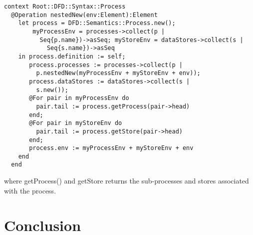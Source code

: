 \begin{lstlisting}
context Root::DFD::Syntax::Process
  @Operation nestedNew(env:Element):Element
    let process = DFD::Semantics::Process.new();
        myProcessEnv = processes->collect(p |
          Seq{p.name})->asSeq; myStoreEnv = dataStores->collect(s |
            Seq{s.name})->asSeq
    in process.definition := self;
       process.processes := processes->collect(p |
         p.nestedNew(myProcessEnv + myStoreEnv + env));
       process.dataStores := dataStores->collect(s |
         s.new());
       @For pair in myProcessEnv do
         pair.tail := process.getProcess(pair->head)
       end;
       @For pair in myStoreEnv do
         pair.tail := process.getStore(pair->head)
       end;
       process.env := myProcessEnv + myStoreEnv + env
    end
  end
\end{lstlisting}where getProcess() and getStore returns the sub-processes and
stores associated with the process.

\section{Conclusion}
